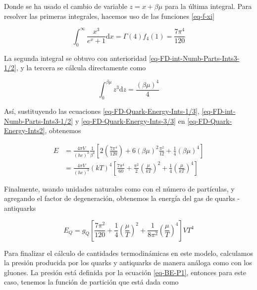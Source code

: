 Donde se ha usado el cambio de variable $z=x+\beta \mu$ para la última integral. Para resolver las primeras integrales, hacemos uso de las funciones \eqref{eq-f-xi}

\begin{equation}\label{eq-FD-Quark-Energy-Ints-1/3}
\int_{0}^{\infty} \frac{{x}^{3}}{{e}^{x} + 1} \mathrm{d} x = \Gamma(4){f}_{4}(1) = \frac{7{\pi}^{4}}{120}
\end{equation}

La segunda integral se obtuvo con anterioridad \eqref{eq-FD-int-Numb-Parts-Ints3-1/2}, y la tercera se cálcula directamente como

\begin{equation}\label{eq-FD-Quark-Energy-Ints-3/3}
\int_{0}^{\beta \mu}{z}^{3} \mathrm{d}z = \frac{(\beta\mu)^{4}}{4}
\end{equation}

Así, sustituyendo las ecuaciones \eqref{eq-FD-Quark-Energy-Ints-1/3}, \eqref{eq-FD-int-Numb-Parts-Ints3-1/2} y \eqref{eq-FD-Quark-Energy-Ints-3/3} en \eqref{eq-FD-Quark-Energy-Ints2}, obtenemos

\begin{equation}
\begin{split}
E & = \frac{4\pi V}{(hc)^{3}} \frac{1}{{\beta}^{4}}  \left[2 \left(\frac{7{\pi}^{4}}{120} \right) + 6 (\beta \mu)^{2} \frac{{\pi}^{2}}{12} + \frac{1}{4}(\beta \mu)^{4}\right] \\
& = \frac{4\pi V}{(hc)^{3}} (kT)^{4} \left[\frac{7{\pi}^{4}}{60} + \frac{{\pi}^{2}}{2} \left(\frac{\mu}{kT} \right)^{2} + \frac{1}{4} \left(\frac{\mu}{kT} \right)^{4}\right]
\end{split}
\end{equation}

Finalmente, usando unidades naturales como con el número de partículas, y agregando el factor de degeneración, obtenemos la energía del gas de quarks - antiquarks

\begin{equation}\label{eq-FD-Quark-Energy}
{E}_{Q} = {g}_{Q} \left[\frac{7{\pi}^{2}}{120} + \frac{1}{4} \left(\frac{\mu}{T} \right)^{2} + \frac{1}{8{\pi}^{2}} \left(\frac{\mu}{T} \right)^{4}\right]V{T}^{4}
\end{equation}

Para finalizar el cálculo de cantidades termodinámicas en este modelo, calculamos la presión producida por los quarks y antiquarks de manera análoga como con los gluones. La presión está definida por la ecuación \eqref{eq-BE-P1}, entonces para este caso, tenemos la función de partición que está dada como

